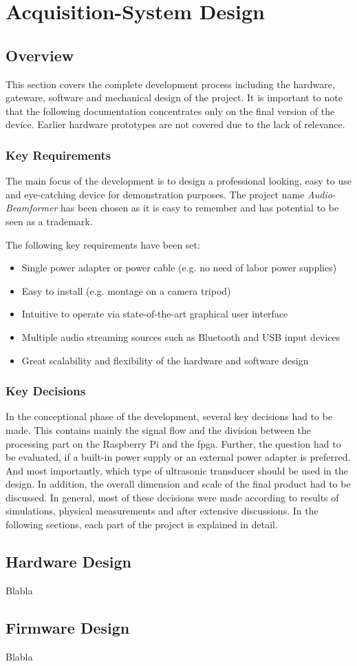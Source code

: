 \chapter{Acquisition-System Design}
\section{Overview}
This section covers the complete development process including the hardware, gateware, software and mechanical design of the project.
It is important to note that the following documentation concentrates only on the final version of the device. Earlier hardware prototypes are not covered due to the lack of relevance.

\subsection{Key Requirements}
The main focus of the development is to design a professional looking, easy to use and eye-catching device for demonstration purposes.
The project name \textit{Audio-Beamformer} has been chosen as it is easy to remember and has potential to be seen as a trademark.

The following key requirements have been set:
\begin{itemize}
	\item Single power adapter or power cable (e.g. no need of labor power supplies)
	\item Easy to install (e.g. montage on a camera tripod)
	\item Intuitive to operate via state-of-the-art graphical user interface
	\item Multiple audio streaming sources such as Bluetooth and USB input devices
	\item Great scalability and flexibility of the hardware and software design
\end{itemize}

\subsection{Key Decisions}
In the conceptional phase of the development, several key decisions had to be made.
This contains mainly the signal flow and the division between the processing part on the Raspberry Pi and the \acrshort{fpga}.
Further, the question had to be evaluated, if a built-in power supply or an external power adapter is preferred.
And most importantly, which type of ultrasonic transducer should be used in the design.
In addition, the overall dimension and scale of the final product had to be discussed.
In general, most of these decisions were made according to results of simulations, physical measurements and after extensive discussions.
In the following sections, each part of the project is explained in detail.


\newpage
\section{Hardware Design}
Blabla


\newpage
\section{Firmware Design}
Blabla




